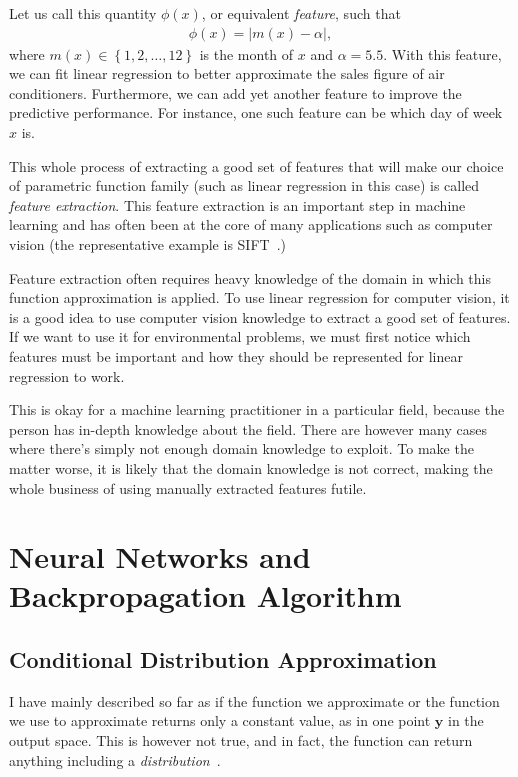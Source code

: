 \documentclass{report}
\newcommand{\vect}[1]{\mathbf{#1}}
\newcommand{\vy}[0]{\vect{y}}
\begin{document}
Let us call this quantity $\phi(x)$, or equivalent {\em feature}, such that
\begin{align}
    \label{eq:feat_month}
    \phi(x) = \left| m(x) - \alpha \right|,
\end{align}
where $m(x) \in \left\{ 1,2,\ldots,12\right\}$ is the month of $x$ and
$\alpha=5.5$.  With this
feature, we can fit linear regression to better approximate the sales figure of
air conditioners. Furthermore, we can add yet another feature to improve the
predictive performance. For instance, one such feature can be which day of week
$x$ is. 

This whole process of extracting a good set of features that will make our
choice of parametric function family (such as linear regression in this case) is
called {\em feature extraction}. This feature extraction is an important step in
machine learning and has often been at the core of many applications such as
computer vision (the representative example is SIFT~\cite{lowe1999object}.)

Feature extraction often requires heavy knowledge of the domain in which this
function approximation is applied. To use linear regression for computer vision,
it is a good idea to use computer vision knowledge to extract a good set of
features. If we want to use it for environmental problems, we must first notice
which features must be important and how they should be represented for linear
regression to work. 

This is okay for a machine learning practitioner in a particular field, because
the person has in-depth knowledge about the field. There are however many cases
where there's simply not enough domain knowledge to exploit. To make the matter
worse, it is likely that the domain knowledge is not correct, making the whole
business of using manually extracted features futile.

\chapter{Neural Networks and Backpropagation Algorithm}
\label{chap:nn}

\section{Conditional Distribution Approximation}
\label{sec:distribution_approx}

I have mainly described so far as if the function we approximate or the function
we use to approximate returns only a constant value, as in one point $\vy$ in
the output space. This is however not true, and in fact, the function can return
anything including a {\em
distribution}~\cite{Bridle1990,denker1991transforming,bishop1994mixture}.
\end{document}

